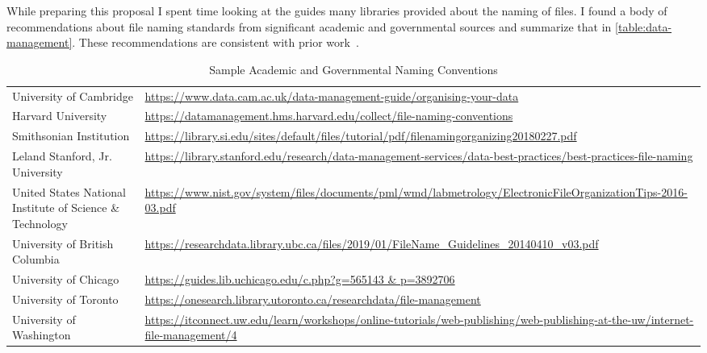 While preparing this proposal I spent time looking at the guides many libraries
provided about the naming of files. I found a body of recommendations about file naming
standards from significant academic and governmental sources and summarize that
in \autoref{table:data-management}.  These recommendations are consistent with
prior work~\cite{briney2015data}.

\begin{sidewaystable}
    \centering
    \caption{Sample Academic and Governmental Naming Conventions}
    \label{table:data-management}
    {\renewcommand{\arraystretch}{2.0} %
        \begin{tabular}{p{5cm}p{15cm}}
            University of Cambridge                                   &
            \url{https://www.data.cam.ac.uk/data-management-guide/organising-your-data}
            \\
            Harvard University                                        &
            \url{https://datamanagement.hms.harvard.edu/collect/file-naming-conventions}
            \\
            Smithsonian Institution                                   &
            \url{https://library.si.edu/sites/default/files/tutorial/pdf/filenamingorganizing20180227.pdf}
            \\
            Leland Stanford, Jr. University                           &
            \url{https://library.stanford.edu/research/data-management-services/data-best-practices/best-practices-file-naming}
            \\
            United States National Institute of Science \& Technology &
            \url{https://www.nist.gov/system/files/documents/pml/wmd/labmetrology/ElectronicFileOrganizationTips-2016-03.pdf}
            \\
            University of British Columbia                            &
            \url{https://researchdata.library.ubc.ca/files/2019/01/FileName_Guidelines_20140410_v03.pdf}
            \\
            University of Chicago                                     &
            \url{https://guides.lib.uchicago.edu/c.php?g=565143       & p=3892706}
            \\
            University of Toronto                                     &
            \url{https://onesearch.library.utoronto.ca/researchdata/file-management}
            \\
            University of Washington                                  &
            \url{https://itconnect.uw.edu/learn/workshops/online-tutorials/web-publishing/web-publishing-at-the-uw/internet-file-management/4}
            \\
        \end{tabular}
    }%
\end{sidewaystable}

